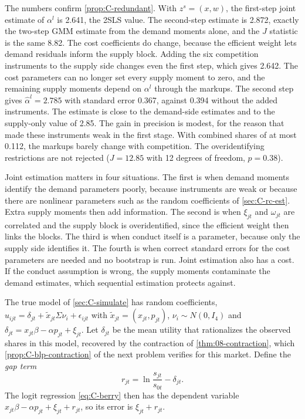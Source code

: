 The numbers confirm \cref{prop:C-redundant}. With $z^s = (x, w)$, the first-step joint estimate of $\alpha^l$ is 2.641, the
2SLS value. The second-step estimate is 2.872, exactly the two-step GMM estimate from the demand moments alone, and the
$J$ statistic is the same 8.82. The cost coefficients do change, because the efficient weight lets demand residuals inform
the supply block. Adding the six competition instruments to the supply side changes even the first step, which gives
2.642. The cost parameters can no longer set every supply moment to zero, and the remaining supply moments depend on
$\alpha^l$ through the markups. The second step gives $\hat\alpha^l = 2.785$ with standard error 0.367, against 0.394
without the added instruments. The estimate is close to the demand-side estimates and to the supply-only value of
2.85. The gain in precision is modest, for the reason that made these instruments weak in the first stage. With combined shares
of at most 0.112, the markups barely change with competition. The overidentifying restrictions are not rejected
($J = 12.85$ with 12 degrees of freedom, $p = 0.38$).

Joint estimation matters in four situations. The first is when demand moments identify the demand parameters poorly,
because instruments are weak or because there are nonlinear parameters such as the random coefficients of
\cref{sec:C-rc-est}. Extra supply moments then add information. The second is when $\xi_{jt}$ and $\omega_{jt}$ are
correlated and the supply block is overidentified, since the efficient weight then links the blocks. The third is when
conduct itself is a parameter, because only the supply side identifies it. The fourth is when correct standard errors for
the cost parameters are needed and no bootstrap is run. Joint estimation also has a cost. If the conduct assumption is
wrong, the supply moments contaminate the demand estimates, which sequential estimation protects against.

The true model of \cref{sec:C-simulate} has random coefficients, $u_{ijt} = \delta_{jt} + \tilde x_{jt}\Sigma\nu_i +
\epsilon_{ijt}$ with $\tilde x_{jt} = (x_{jt}, p_{jt})$, $\nu_i \sim N(0, I_4)$ and $\delta_{jt} = x_{jt}\beta - \alpha
p_{jt} + \xi_{jt}$. Let $\delta_{jt}$ be the mean utility that rationalizes the observed shares in this model, recovered
by the contraction of \cref{thm:08-contraction}, which \cref{prop:C-blp-contraction} of the next problem verifies for
this market. Define the \emph{gap term}
\begin{equation}\label{eq:C-gap}
  r_{jt} = \ln\frac{s_{jt}}{s_{0t}} - \delta_{jt} .
\end{equation}
The logit regression \eqref{eq:C-berry} then has the dependent variable $x_{jt}\beta - \alpha p_{jt} + \xi_{jt} +
r_{jt}$, so its error is $\xi_{jt} + r_{jt}$.

